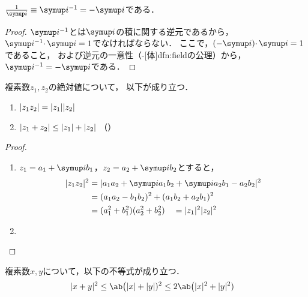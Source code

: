 \documentclass[../sotsu.tex]{subfiles}
\begin{document}
\begin{proposition}
    $\frac{1}{\iu} \equiv \iu^{-1} = -\iu$である．
\end{proposition}

\begin{proof}
    $\iu^{-1}$とは$\iu$の積に関する逆元であるから，
    $\iu^{-1} \cdotp \iu = 1$でなければならない．
    ここで，$(-\iu) \cdotp \iu = 1$であること，
    および逆元の一意性（-[体]{dfn:field}の公理）から，$\iu^{-1} = -\iu$である．
\end{proof}

\begin{proposition}
    複素数$z_1, z_2$の絶対値について，
    以下が成り立つ．
    \begin{enumerate}
        \item $\lvert z_1 z_2\rvert = \lvert z_1\rvert \lvert z_2\rvert$
        \item $\lvert z_1 + z_2\rvert \leq \lvert z_1\rvert + \lvert z_2\rvert$
            （）
    \end{enumerate}
\end{proposition}

\begin{proof}
    \begin{enumerate}
        \item $z_1 = a_1 + \iu b_1$，$z_2 = a_2 + \iu b_2$とすると，
            \begin{equation*}
                \begin{split}
                    \abs{z_1 z_2}^2 
                        &= \abs{ a_1 a_2 + \iu a_1 b_2 + \iu a_2 b_1 - a_2 b_2 }^2   \\
                        &= (a_1 a_2 - b_1 b_2)^2 + (a_1 b_2 + a_2 b_1)^2   \\
                        &= (a_1^2 + b_1^2) (a_2^2 + b_2^2)
                        \quad = \abs{z_1}^2 \abs{z_2}^2
                \end{split}
            \end{equation*}
        \item 
    \end{enumerate}
\end{proof}


\begin{proposition}
    \label{thm:complex-abs-squared-inequality}
    複素数$x, y$について，以下の不等式が成り立つ．
    \begin{align}
        \label{eq:complex-abs-squared-inequality}
        \abs{x + y}^2 
            &\leq \ab\big( \abs{x} + \abs{y} )^2 
            \leq 2\ab\big( \abs{x}^2 + \abs{y}^2 )
    \end{align}
\end{proposition}
\end{document}
